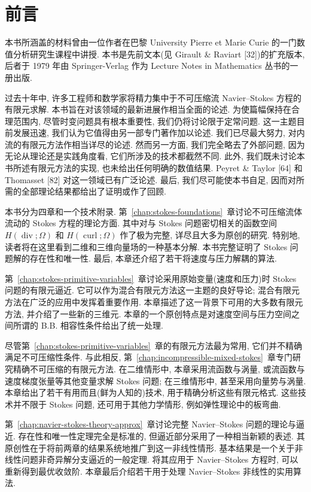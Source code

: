 \section*{前言}
\label{sec:frontmatter-preface}

本书所涵盖的材料曾由一位作者在巴黎 University Pierre et Marie Curie 的一门数值分析研究生课程中讲授. 本书是先前文本(见 Girault \& Raviart [32])的扩充版本, 后者于 1979 年由 Springer-Verlag 作为 Lecture Notes in Mathematics 丛书的一册出版.

过去十年中, 许多工程师和数学家将精力集中于不可压缩流 Navier--Stokes 方程的有限元求解. 本书旨在对该领域的最新进展作相当全面的论述. 为使篇幅保持在合理范围内, 尽管时变问题具有根本重要性, 我们仍将讨论限于定常问题. 这一主题目前发展迅速, 我们认为它值得由另一部专门著作加以论述. 我们已尽最大努力, 对内流的有限元方法作相当详尽的论述. 然而另一方面, 我们完全略去了外部问题, 因为无论从理论还是实践角度看, 它们所涉及的技术都截然不同. 此外, 我们既未讨论本书所述有限元方法的实现, 也未给出任何明确的数值结果. Peyret \& Taylor [64] 和 Thomasset [82] 对这一领域已有广泛论述. 最后, 我们尽可能使本书自足, 因而对所需的全部理论结果都给出了证明或作了回顾.

本书分为四章和一个技术附录. 第~\ref{chap:stokes-foundations}~章讨论不可压缩流体流动的 Stokes 方程的理论方面. 其中对与 Stokes 问题密切相关的函数空间 $H(\operatorname{div};\Omega)$ 和 $H(\operatorname{curl};\Omega)$ 作了极为完整, 详尽且大多为原创的研究. 特别地, 读者将在这里看到二维和三维向量场的一种基本分解. 本书完整证明了 Stokes 问题解的存在性和唯一性. 最后, 本章还介绍了若干将速度与压力解耦的算法.

第~\ref{chap:stokes-primitive-variables}~章讨论采用原始变量(速度和压力)时 Stokes 问题的有限元逼近. 它可以作为混合有限元方法这一主题的良好导论; 混合有限元方法在广泛的应用中发挥着重要作用. 本章描述了这一背景下可用的大多数有限元方法, 并介绍了一些新的三维元. 本章的一个原创特点是对速度空间与压力空间之间所谓的 B.B. 相容性条件给出了统一处理.

尽管第~\ref{chap:stokes-primitive-variables}~章的有限元方法最为常用, 它们并不精确满足不可压缩性条件. 与此相反, 第~\ref{chap:incompressible-mixed-stokes}~章专门研究精确不可压缩的有限元方法. 在二维情形中, 本章采用流函数与涡量, 或流函数与速度梯度张量等其他变量求解 Stokes 问题; 在三维情形中, 甚至采用向量势与涡量. 本章给出了若干有用而且(鲜为人知的)技术, 用于精确分析这些有限元格式. 这些技术并不限于 Stokes 问题, 还可用于其他力学情形, 例如弹性理论中的板弯曲.

第~\ref{chap:navier-stokes-theory-approx}~章讨论完整 Navier--Stokes 问题的理论与逼近. 存在性和唯一性定理完全是标准的, 但逼近部分采用了一种相当新颖的表述. 其原创性在于将前两章的结果系统地推广到这一非线性情形. 基本结果是一个关于非线性问题非奇异解分支逼近的一般定理. 将其应用于 Navier--Stokes 方程时, 可以重新得到最优收敛阶. 本章最后介绍若干用于处理 Navier--Stokes 非线性的实用算法.

